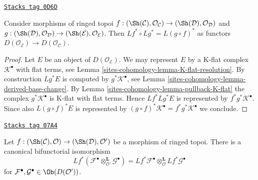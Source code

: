 \begin{lemma}
\label{sites-cohomology-lemma-derived-pullback-composition}
\href{https://stacks.math.columbia.edu/tag/0D6D}{\texttt{Stacks tag 0D6D}}

Consider morphisms of ringed topoi
$f : (\Sh(\mathcal{C}), \mathcal{O}_\mathcal{C}) \to
(\Sh(\mathcal{D}), \mathcal{O}_\mathcal{D})$
and
$g : (\Sh(\mathcal{D}), \mathcal{O}_\mathcal{D}) \to
(\Sh(\mathcal{E}), \mathcal{O}_\mathcal{E})$.
Then $Lf^* \circ Lg^* = L(g \circ f)^*$ as functors
$D(\mathcal{O}_\mathcal{E}) \to D(\mathcal{O}_\mathcal{C})$.
\end{lemma}

\begin{proof}
Let $E$ be an object of $D(\mathcal{O}_\mathcal{E})$.
We may represent $E$ by a K-flat complex $\mathcal{K}^\bullet$
with flat terms, see Lemma \ref{sites-cohomology-lemma-K-flat-resolution}.
By construction $Lg^*E$ is computed by $g^*\mathcal{K}^\bullet$, see
Lemma \ref{sites-cohomology-lemma-derived-base-change}.
By Lemma \ref{sites-cohomology-lemma-pullback-K-flat} the complex
$g^*\mathcal{K}^\bullet$ is K-flat with flat terms.
Hence $Lf^*Lg^*E$ is represented by $f^*g^*\mathcal{K}^\bullet$.
Since also $L(g \circ f)^*E$ is represented by
$(g \circ f)^*\mathcal{K}^\bullet = f^*g^*\mathcal{K}^\bullet$
we conclude.
\end{proof}

\begin{lemma}
\label{sites-cohomology-lemma-pullback-tensor-product}
\href{https://stacks.math.columbia.edu/tag/07A4}{\texttt{Stacks tag 07A4}}

Let $f : (\Sh(\mathcal{C}), \mathcal{O}) \to (\Sh(\mathcal{D}), \mathcal{O}')$
be a morphism of ringed topoi.
There is a canonical bifunctorial isomorphism
$$
Lf^*(
\mathcal{F}^\bullet \otimes_{\mathcal{O}'}^{\mathbf{L}} \mathcal{G}^\bullet
) =
Lf^*\mathcal{F}^\bullet
\otimes_{\mathcal{O}}^{\mathbf{L}}
Lf^*\mathcal{G}^\bullet
$$
for $\mathcal{F}^\bullet, \mathcal{G}^\bullet \in \Ob(D(\mathcal{O}'))$.
\end{lemma}

